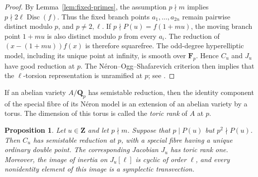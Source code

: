 \documentclass[11pt,hidelinks]{amsart}
\newtheorem{proposition}[theorem]{Proposition}
\newcommand{\Q}{\mathbf Q}
\newcommand{\Z}{\mathbf Z}
\newcommand{\F}{\mathbf F}
\newcommand{\Disc}{\operatorname{Disc}}
\begin{document}
\begin{proof}
By Lemma~\ref{lem:fixed-primes}, the assumption $p\nmid m$ implies $p\nmid2\ell\Disc(f)$. Thus the fixed branch points $a_1,\ldots,a_{2n}$ remain pairwise distinct modulo $p$, and $p\neq2,\ell$. If $p\nmid P(u)=f(1+mu)$, the moving branch point $1+mu$ is also distinct modulo $p$ from every $a_i$. The reduction of $(x-(1+mu))f(x)$ is therefore squarefree. The odd-degree hyperelliptic model, including its unique point at infinity, is smooth over $\F_p$. Hence $C_u$ and $J_u$ have good reduction at $p$. The N\'eron--Ogg--Shafarevich criterion then implies that the $\ell$-torsion representation is unramified at $p$; see \cite{SerreTate1968}.
\end{proof}

If an
abelian variety $A/\Q_p$ has semistable reduction, then the identity
component of the special fibre of its N\'eron model is an extension of an
abelian variety by a torus.  The dimension of this torus is called the
\emph{toric rank} of $A$ at $p$. 

\begin{proposition}\label{prop:local-transvection}
Let $u\in\Z$ and let $p\nmid m$. Suppose that $p\mid P(u)$ but
$p^2\nmid P(u)$. Then $C_u$ has semistable reduction at $p$, with a
special fibre having a unique ordinary double point.  The corresponding
Jacobian $J_u$ has toric rank one.  Moreover, the image of inertia on
$J_u[\ell]$ is cyclic of order $\ell$, and every nonidentity element of
this image is a symplectic transvection.
\end{proposition}
\end{document}
